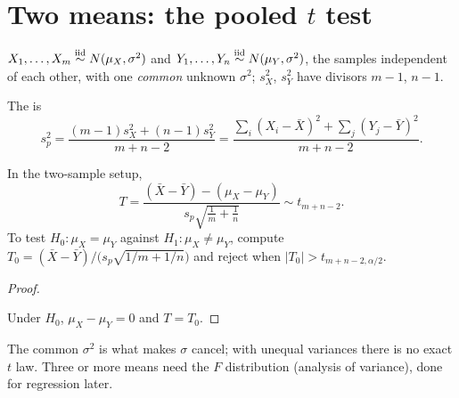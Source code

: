 \section{Two means: the pooled $t$ test}

\begin{setup}
$X_1,\dots,X_m\overset{\text{iid}}{\sim} N(\mu_X,\sigma^2)$ and $Y_1,\dots,Y_n\overset{\text{iid}}{\sim} N(\mu_Y,\sigma^2)$, the samples independent of each other, with one \emph{common} unknown $\sigma^2$; $s_X^2$, $s_Y^2$ have divisors $m-1$, $n-1$.
\end{setup}

\begin{definition}
The  is
\[
  \boxed{\;s_p^2=\frac{(m-1)s_X^2+(n-1)s_Y^2}{m+n-2}=\frac{\sum_i(X_i-\bar X)^2+\sum_j(Y_j-\bar Y)^2}{m+n-2}.\;}
\]
\end{definition}

\begin{theorem}
In the two-sample setup,
\[
  \boxed{\;T=\frac{(\bar X-\bar Y)-(\mu_X-\mu_Y)}{s_p\sqrt{\frac1m+\frac1n}}\sim t_{m+n-2}.\;}
\]
To test $H_0:\mu_X=\mu_Y$ against $H_1:\mu_X\ne\mu_Y$, compute $T_0=(\bar X-\bar Y)/\big(s_p\sqrt{1/m+1/n}\big)$ and reject when $|T_0|>t_{m+n-2,\alpha/2}$.
\end{theorem}
\begin{proof}
\begin{deriv}
\end{deriv}
Under $H_0$, $\mu_X-\mu_Y=0$ and $T=T_0$.
\end{proof}

The common $\sigma^2$ is what makes $\sigma$ cancel; with unequal variances there is no exact $t$ law. Three or more means need the $F$ distribution (analysis of variance), done for regression later.

